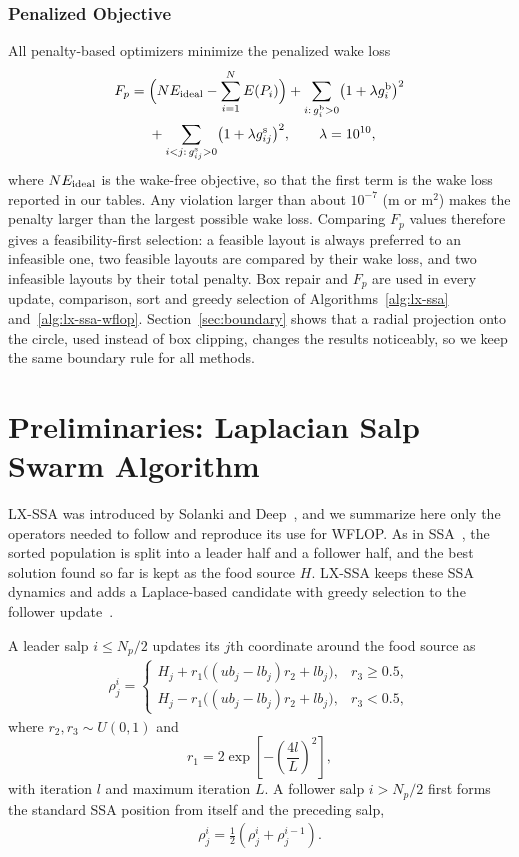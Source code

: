 \documentclass[journal,twoside]{IEEEtran}
\begin{document}
\subsubsection{Penalized Objective}
All penalty-based optimizers minimize the penalized wake loss
\begin{equation}
\begin{split}
F_p={}&\Bigl(N E_{\rm ideal}-\sum_{i=1}^{N}E(P_i)\Bigr)+\sum_{i:\,g^{\rm b}_i>0}\bigl(1+\lambda g^{\rm b}_i\bigr)^2\\
&+\sum_{i<j:\,g^{\rm s}_{ij}>0}\bigl(1+\lambda g^{\rm s}_{ij}\bigr)^2,\qquad \lambda=10^{10},
\end{split}
\label{eq:penalty}
\end{equation}
where $N E_{\rm ideal}$ is the wake-free objective, so that the first term is the wake loss reported in our tables. Any violation larger than about $10^{-7}$ (m or m$^2$) makes the penalty larger than the largest possible wake loss. Comparing $F_p$ values therefore gives a feasibility-first selection: a feasible layout is always preferred to an infeasible one, two feasible layouts are compared by their wake loss, and two infeasible layouts by their total penalty. Box repair and $F_p$ are used in every update, comparison, sort and greedy selection of Algorithms~\ref{alg:lx-ssa} and~\ref{alg:lx-ssa-wflop}. Section~\ref{sec:boundary} shows that a radial projection onto the circle, used instead of box clipping, changes the results noticeably, so we keep the same boundary rule for all methods.

\section{Preliminaries: Laplacian Salp Swarm Algorithm}
\label{sec:lxssa}

LX-SSA was introduced by Solanki and Deep~\cite{Solanki2023}, and we summarize here only the operators needed to follow and reproduce its use for WFLOP. As in SSA~\cite{Mirjalili2017}, the sorted population is split into a leader half and a follower half, and the best solution found so far is kept as the food source $H$. LX-SSA keeps these SSA dynamics and adds a Laplace-based candidate with greedy selection to the follower update~\cite{Solanki2023,Deep2007}.

A leader salp $i\le N_p/2$ updates its $j$th coordinate around the food source as
\begin{align}\label{eq12}
\rho_j^i =
\begin{cases}
H_j+r_1\big((ub_j-lb_j)r_2+lb_j\big), & r_3\ge0.5,\\
H_j-r_1\big((ub_j-lb_j)r_2+lb_j\big), & r_3<0.5,
\end{cases}
\end{align}
where $r_2,r_3\sim U(0,1)$ and
\[
r_1=2\exp\!\left[-\left(\frac{4l}{L}\right)^2\right],
\]
with iteration $l$ and maximum iteration $L$. A follower salp $i>N_p/2$ first forms the standard SSA position from itself and the preceding salp,
\begin{align}\label{eq14}
\rho_j^i=\frac{1}{2}\left(\rho_j^i+\rho_j^{i-1}\right).
\end{align}
\end{document}
